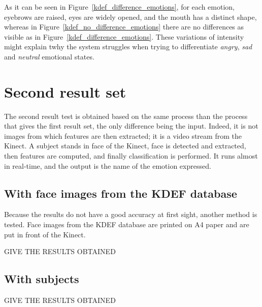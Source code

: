 \noindent As it can be seen in Figure~\ref{kdef_difference_emotions}, for each emotion, eyebrows are raised, eyes are widely opened, and the mouth has a distinct shape, whereas in Figure~\ref{kdef_no_difference_emotions} there are no differences as visible as in Figure~\ref{kdef_difference_emotions}. These variations of intensity might explain twhy the system struggles when trying to differentiate \textit{angry}, \textit{sad} and \textit{neutral} emotional states.
\newline

\section{Second result set}

\vspace{\baselineskip}
\noindent The second result test is obtained based on the same process than the process that gives the first result set, the only difference being the input. Indeed, it is not images from which features are then extracted; it is a video stream from the Kinect. A subject stands in face of the Kinect, face is detected and extracted, then features are computed, and finally classification is performed. It runs almost in real-time, and the output is the name of the emotion expressed.
\newline

\subsection{With face images from the KDEF database}

\vspace{\baselineskip}
\noindent Because the results do not have a good accuracy at first sight, another method is tested. Face images from the KDEF database are printed on A4 paper and are put in front of the Kinect.
\newline

\noindent GIVE THE RESULTS OBTAINED
\newline

\subsection{With subjects}

\vspace{\baselineskip}
\noindent GIVE THE RESULTS OBTAINED
\newline

